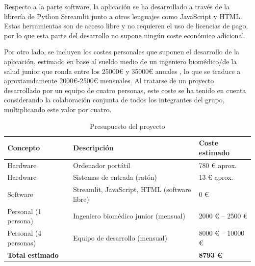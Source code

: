 Respecto a la parte software, la aplicación se ha desarrollado a través de la librería de Python Streamlit junto a otros lenguajes como JavaScript y HTML. Estas herramientas son de acceso libre y no requieren el uso de licencias de pago, por lo que esta parte del desarrollo no supone ningún coste económico adicional.

Por otro lado, se incluyen los costes personales que suponen el desarrollo de la aplicación, estimado en base al sueldo medio de un ingeniero biomédico/de la salud junior que ronda entre los 25000€ y 35000€ anuales \cite{ufv_biomedico_salario_espana}, lo que se traduce a aproxiamdamente 2000€-2500€ mensuales. Al tratarse de un proyecto desarrollado por un equipo de cuatro personas, este coste se ha tenido en cuenta considerando la colaboración conjunta de todos los integrantes del grupo, multiplicando este valor por cuatro.

\begin{table}[h]
\centering
\begin{tabular}{|l|l|l|}

\hline
\rowcolor{gray!20}
\textbf{Concepto} & \textbf{Descripción} & \textbf{Coste estimado} \\ \hline
Hardware & Ordenador portátil & 780 € aprox. \\ 
Hardware & Sistemas de entrada (ratón) & 13 € aprox. \\ \hline
Software & Streamlit, JavaScript, HTML (software libre) & 0 € \\ \hline
Personal (1 persona) & Ingeniero biomédico junior (mensual) & 2000 € -- 2500 € \\ 
Personal (4 personas) & Equipo de desarrollo (mensual) & 8000 € -- 10000 € \\ \hline
\rowcolor{yellow!30}
\textbf{Total estimado} &  & \textbf{8793 €} \\ \hline
\end{tabular}
\caption{Presupuesto del proyecto}
\label{tab:presupuesto}
\end{table}